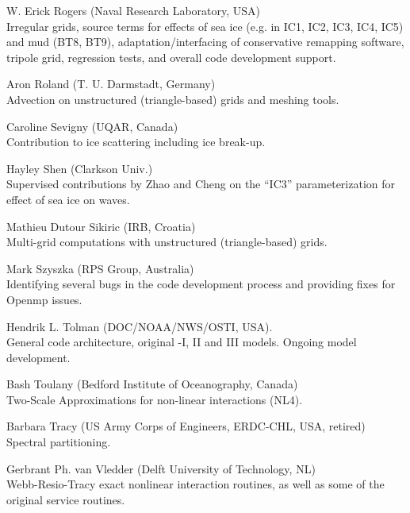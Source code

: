 \begin{list}{\ldots}{ }
\item [W. Erick Rogers]  (Naval Research Laboratory, USA)\\ 
  Irregular grids, source terms for effects of sea ice (e.g. in IC1, IC2, IC3, IC4, IC5) and mud (BT8, BT9), adaptation/interfacing of conservative remapping software, tripole grid, regression tests, and overall code development support.

\item [Aron Roland] (T. U. Darmstadt, Germany) \\
  Advection on unstructured (triangle-based) grids and meshing tools.

\item [Caroline Sevigny] (UQAR, Canada) \\
  Contribution to ice scattering including ice break-up.

\item [Hayley Shen] (Clarkson Univ.) \\
  Supervised contributions by Zhao and Cheng on the ``IC3'' parameterization for effect of sea ice on waves.

\item [Mathieu Dutour Sikiric] (IRB, Croatia) \\
  Multi-grid computations with unstructured (triangle-based) grids.

\item [Mark Szyszka] (RPS Group, Australia) \\
  Identifying several bugs in the code development process and providing fixes for Openmp issues.

\item [Hendrik L. Tolman] (DOC/NOAA/NWS/OSTI, USA). \\
  General code architecture, original \wt-I, II and III models. Ongoing model
  development.

\item [Bash Toulany] (Bedford Institute of Oceanography, Canada)\\
 Two-Scale Approximations for non-linear interactions (NL4).

\item [Barbara Tracy] (US Army Corps of Engineers, ERDC-CHL, USA, retired) \\
  Spectral partitioning.

\item [Gerbrant Ph. van Vledder] (Delft University of Technology, NL) \\
  Webb-Resio-Tracy exact nonlinear interaction routines, as well as some of
  the original service routines.


\end{list}
